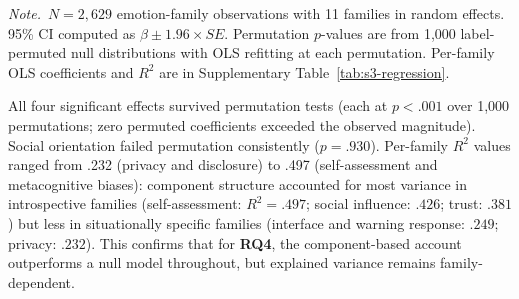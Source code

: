 \documentclass[12pt,a4paper]{article}
\newcommand{\ecbss}{\textsc{ECBSS}}
\newcommand{\tabnote}[1]{%
  \par\vspace{3pt}\noindent%
  \begin{minipage}{0.96\linewidth}\footnotesize\raggedright\textit{Note.}~#1\end{minipage}%
}
\begin{document}
\begin{table}[tb]
  \raggedright
  \small
  \caption{Mixed-effects regression of \ecbss{} on affective components}
  \label{tab:mixed_effects}
  \tabnote{$N = 2{,}629$ emotion-family observations with 11 families in random effects. 95\% CI computed as $\beta \pm 1.96 \times SE$. Permutation $p$-values are from 1,000 label-permuted null distributions with OLS refitting at each permutation. Per-family OLS coefficients and $R^2$ are in Supplementary Table~\ref{tab:s3-regression}.}
\end{table}

All four significant effects survived permutation tests (each at $p < .001$ over 1,000 permutations; zero permuted coefficients exceeded the observed magnitude). Social orientation failed permutation consistently ($p = .930$). Per-family $R^2$ values ranged from .232 (privacy and disclosure) to .497 (self-assessment and metacognitive biases): component structure accounted for most variance in introspective families (self-assessment: $R^2 = .497$; social influence: $.426$; trust: $.381$) but less in situationally specific families (interface and warning response: $.249$; privacy: $.232$). This confirms that for \textbf{RQ4}, the component-based account outperforms a null model throughout, but explained variance remains family-dependent.
\end{document}
